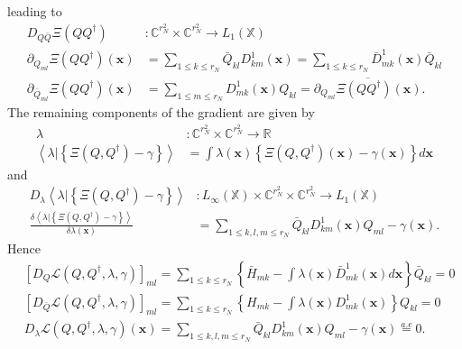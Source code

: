 \documentclass[aps,preprint]{revtex4}%
\begin{document}
leading to
\begin{align}
D_{Q\bar{Q}}\Xi\left(  QQ^{\dagger}\right)   &  :\mathbb{C}^{r_{N}^{2}}%
\times\mathbb{C}^{r_{N}^{2}}\rightarrow L_{1}\left(  \mathbb{X}\right)
\nonumber\\
\partial_{Q_{ml}}\Xi\left(  QQ^{\dagger}\right)  \left(  \mathbf{x}\right)
&  =\sum_{1\leq k\leq r_{N}}\bar{Q}_{kl}D_{km}^{1}\left(  \mathbf{x}\right)
=\sum_{1\leq k\leq r_{N}}\bar{D}_{mk}^{1}\left(  \mathbf{x}\right)  \bar
{Q}_{kl}\nonumber\\
\partial_{\bar{Q}_{ml}}\Xi\left(  QQ^{\dagger}\right)  \left(  \mathbf{x}%
\right)   &  =\sum_{1\leq m\leq r_{N}}D_{mk}^{1}\left(  \mathbf{x}\right)
Q_{kl}=\overline{\partial_{Q_{ml}}\Xi\left(  QQ^{\dagger}\right)  \left(
\mathbf{x}\right)  }.
\end{align}
The remaining components of the gradient are given by
\begin{align}
\lambda &  :\mathbb{C}^{r_{N}^{2}}\times\mathbb{C}^{r_{N}^{2}}\rightarrow
\mathbb{R}\nonumber\\
\left\langle \left.  \lambda\right\vert \left\{  \Xi\left(  Q,Q^{\dagger
}\right)  -\gamma\right\}  \right\rangle  &  =\int\lambda\left(
\mathbf{x}\right)  \left\{  \Xi\left(  Q,Q^{\dagger}\right)  \left(
\mathbf{x}\right)  -\gamma\left(  \mathbf{x}\right)  \right\}  d\mathbf{x}%
\end{align}
and
\begin{align}
D_{\lambda}\left\langle \left.  \lambda\right\vert \left\{  \Xi\left(
Q,Q^{\dagger}\right)  -\gamma\right\}  \right\rangle  &  :L_{\infty}\left(
\mathbb{X}\right)  \times\mathbb{C}^{r_{N}^{2}}\times\mathbb{C}^{r_{N}^{2}%
}\rightarrow L_{1}\left(  \mathbb{X}\right) \nonumber\\
\frac{\delta\left\langle \left.  \lambda\right\vert \left\{  \Xi\left(
Q,Q^{\dagger}\right)  -\gamma\right\}  \right\rangle }{\delta\lambda\left(
\mathbf{x}\right)  }  &  =\sum_{1\leq k,l,m\leq r_{N}}\bar{Q}_{kl}D_{km}%
^{1}\left(  \mathbf{x}\right)  Q_{ml}-\gamma\left(  \mathbf{x}\right)  .
\end{align}
Hence
\begin{align}
&  \left[  D_{Q}\mathcal{L}\left(  Q,Q^{\dagger},\lambda,\gamma\right)
\right]  _{ml}=\sum_{1\leq k\leq r_{N}}\left\{  \bar{H}_{mk}-\int
\lambda\left(  \mathbf{x}\right)  \bar{D}_{mk}^{1}\left(  \mathbf{x}\right)
d\mathbf{x}\right\}  \bar{Q}_{kl}=0\nonumber\\
&  \left[  D_{\bar{Q}}\mathcal{L}\left(  Q,Q^{\dagger},\lambda,\gamma\right)
\right]  _{ml}=\sum_{1\leq k\leq r_{N}}\left\{  H_{mk}-\int\lambda\left(
\mathbf{x}\right)  D_{mk}^{1}\left(  \mathbf{x}\right)  \right\}
Q_{kl}=0\nonumber\\
&  D_{\lambda}\mathcal{L}\left(  Q,Q^{\dagger},\lambda,\gamma\right)  \left(
\mathbf{x}\right)  =\sum_{1\leq k,l,m\leq r_{N}}\bar{Q}_{kl}D_{km}^{1}\left(
\mathbf{x}\right)  Q_{ml}-\gamma\left(  \mathbf{x}\right)  \overset{a.e}{=}0.
\end{align}
\end{document}
